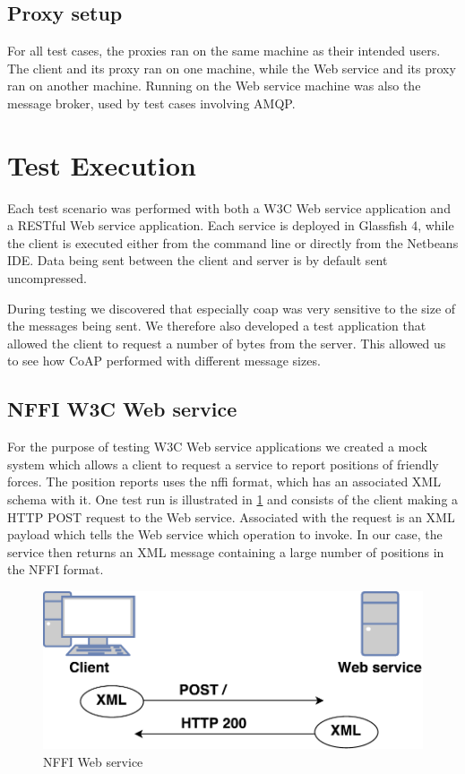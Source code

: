 \subsection{Proxy setup}

For all test cases, the proxies ran on the same machine as their intended users.
The client and its proxy ran on one machine, while the Web service and its proxy
ran on another machine. Running on the Web service machine was also the message
broker, used by test cases involving AMQP.

\section{Test Execution}

 Each test scenario was performed with both a W3C Web service application and a
 RESTful Web service application. Each service is deployed in Glassfish 4, while
 the client is executed either from the command line or directly from the
 Netbeans IDE. Data being sent between the client and server is by default sent
 uncompressed.

During testing we discovered that especially \gls{coap} was very sensitive to
the size of the messages being sent. We therefore also developed a test
application that allowed the client to request a number of bytes from the
server. This allowed us to see how CoAP performed with different message sizes.

\subsection{NFFI W3C Web service}

For the purpose of testing W3C Web service applications we created a mock system
which allows a client to request a service to report positions of friendly
forces. The position reports uses the \gls{nffi} format, which has an associated
XML schema with it. One test run is illustrated in \cref{figure-nffi-flow} and
consists of the client making a HTTP POST request to the Web service. Associated
with the request is an XML payload which tells the Web service which operation
to invoke. In our case, the service then returns an XML message containing a
large number of positions in the NFFI format.

\begin{figure}[h]
\centering
\includegraphics[scale=0.6]{images/nffi_flow.pdf}
\caption{NFFI Web service}
\label{figure-nffi-flow}
\end{figure}


